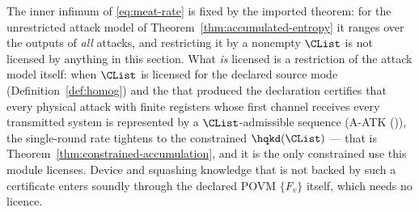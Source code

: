 
\begin{remark}
\label{rem:no-constraints}
The inner infimum of \eqref{eq:meat-rate} is fixed by the imported
theorem: for the unrestricted attack model of
Theorem~\ref{thm:accumulated-entropy} it ranges over the outputs of
\emph{all} attacks, and restricting it by a nonempty $\CList$ is not
licensed by anything in this section. What \emph{is} licensed is a
restriction of the attack model itself: when $\CList$ is
licensed for the declared source mode (Definition~\ref{def:homog}) and the
 that produced the declaration certifies that every
physical attack with finite registers whose first channel receives every
transmitted system is
represented by a $\CList$-admissible sequence (A-ATK
()), the single-round rate tightens to the
constrained $\hqkd(\CList)$ --- that is
Theorem~\ref{thm:constrained-accumulation}, and it is the only constrained
use this module licenses. Device and squashing knowledge that is not backed
by such a certificate enters soundly through the declared POVM $\{F_v\}$
itself, which needs no licence.
\end{remark}
